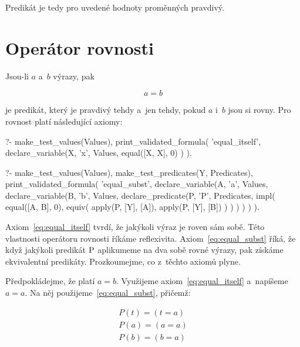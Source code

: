 Predikát je tedy pro uvedené hodnoty proměnných pravdivý.


\section{Operátor rovnosti}
\label{sec:equality_operator}

Jsou-li \(a\) a~\(b\) výrazy, pak

\begin{equation}
a = b
\end{equation}

je predikát, který je pravdivý tehdy a~jen tehdy, pokud \(a\) i~\(b\) jsou si rovny. Pro rovnost platí následující axiomy:

\begin{fact}
\begin{prolog}
?- 	make_test_values(Values),
	print_validated_formula(
		'equal_itself',
		declare_variable(X, 'x', Values,
			equal([X, X], 0)
		)
	).
\end{prolog}
\begin{prolog}
?- 	make_test_values(Values),
	make_test_predicates(Y, Predicates),
	print_validated_formula(
		'equal_subst',
		declare_variable(A, 'a', Values,
			declare_variable(B, 'b', Values,
				declare_predicate(P, 'P', Predicates,
					impl(
						equal([A, B], 0),
						equiv(
							apply(P, [Y], [A]),
							apply(P, [Y], [B])
						)
					)
				)
			)
		)
	).
\end{prolog}
\end{fact}

Axiom~\eqref{eq:equal_itself} tvrdí, že jakýkoli výraz je roven sám sobě. Této vlastnosti operátoru rovnosti říkáme reflexivita. Axiom~\eqref{eq:equal_subst} říká, že když jakýkoli predikát \(\mathrm{P}\) aplikumeme na dva sobě rovné výrazy, pak získáme ekvivalentní predikáty. Prozkoumejme, co z~těchto axiomů plyne.

Předpokládejme, že platí \(a = b\). Využijeme axiom~\eqref{eq:equal_itself} a~napíšeme \(a = a\). Na něj použijeme~\eqref{eq:equal_subst}, přičemž:

\begin{equation}
\begin{split}
P(t) = (t = a) \\
P(a) = (a = a) \\
P(b) = (b = a)
\end{split}
\end{equation}

